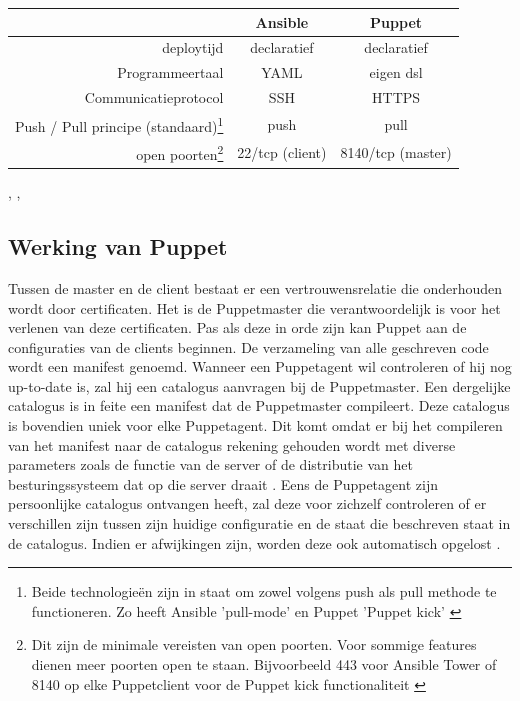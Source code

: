 \begin{minipage}{15cm}
\begin{tabular}{ r |c c }
& \textbf{Ansible} & \textbf{Puppet} \\
  \hline	  		
\gls{deploytijd}  & declaratief & declaratief  \\
   \hline
 Programmeertaal & YAML & eigen \gls{dsl}  \\
     \hline
   Communicatieprotocol & SSH & HTTPS \\
   \hline
  Push / Pull principe (standaard)\footnote{Beide technologie\"en zijn in staat om zowel volgens push als pull methode te functioneren. Zo heeft Ansible 'pull-mode' en Puppet 'Puppet kick' \autocite{ansiblepull]} \autocite{puppetkick}} & \gls{push} & \gls{pull} \\
   \hline
   open poorten\footnote{Dit zijn de minimale vereisten van open poorten. Voor sommige features dienen meer poorten open te staan. Bijvoorbeeld 443 voor Ansible Tower of 8140 op elke Puppetclient voor de Puppet kick functionaliteit \autocite{puppetkick} }  & 22/tcp (client) & 8140/tcp (master)\\
  \end{tabular}
  \end{minipage}   



 \textcite{languagePuppet}, \textcite{masterproef}, \textcite{ansibledoc}

\subsection{Werking van Puppet}

Tussen de master en de client bestaat er een vertrouwensrelatie die onderhouden wordt door certificaten. Het is de Puppetmaster die verantwoordelijk is voor het verlenen van deze certificaten. Pas als deze in orde zijn kan Puppet  aan de configuraties van de clients beginnen. De verzameling van alle geschreven code wordt een manifest genoemd. Wanneer een Puppetagent wil controleren of hij nog up-to-date is, zal hij een catalogus aanvragen bij de Puppetmaster. Een dergelijke catalogus is in feite een manifest dat de Puppetmaster compileert. Deze catalogus is bovendien uniek voor elke Puppetagent. Dit komt omdat er bij het compileren van het manifest naar de catalogus rekening gehouden wordt met diverse parameters zoals de functie van de server of de distributie van het besturingssysteem dat op die server draait \autocite{Puppetlanguagecatalog}. Eens de Puppetagent zijn persoonlijke catalogus ontvangen heeft, zal deze voor zichzelf controleren of er verschillen zijn tussen zijn huidige configuratie en de staat die beschreven staat in de catalogus. Indien er afwijkingen zijn, worden deze ook automatisch opgelost \autocite{puppetdoc}.

